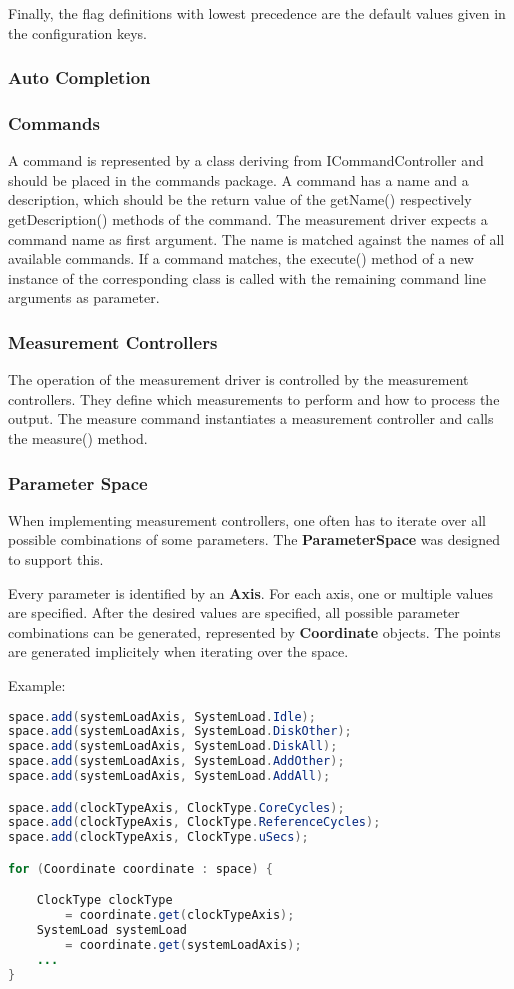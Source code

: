 \documentclass[a4paper,12pt]{article}
\newcommand{\class}[1]{\textbf{#1}}
\begin{document}
Finally, the flag definitions with lowest precedence are the default values
given in the configuration keys.

\subsubsection{Auto Completion}

\subsubsection{Commands}
A command is represented by a class deriving from ICommandController and should
be placed in the commands package. A command has a name and a description, which
should be the return value of the getName() respectively getDescription()
methods of the command. The measurement driver expects a command name as first
argument. The name is matched against the names of all available commands. If a
command matches, the execute() method of a new instance of the corresponding
class is called with the remaining command line arguments as parameter.

\subsubsection{Measurement Controllers}
The operation of the measurement driver is controlled by the measurement
controllers. They define which measurements to perform and how to process the
output. The measure command instantiates a measurement controller and calls the
measure() method.

\subsubsection{Parameter Space}
When implementing measurement controllers, one often has to iterate over all
possible combinations of some parameters. The \class{ParameterSpace} was
designed to support this. 

Every parameter is identified by an \class{Axis}. For
each axis, one or multiple values are specified. After the desired values are
specified, all possible parameter combinations can be generated, represented by
\class{Coordinate} objects. The points are generated implicitely when iterating
over the space.

Example:
\begin{lstlisting}[language=Java]
space.add(systemLoadAxis, SystemLoad.Idle);
space.add(systemLoadAxis, SystemLoad.DiskOther);
space.add(systemLoadAxis, SystemLoad.DiskAll);
space.add(systemLoadAxis, SystemLoad.AddOther);
space.add(systemLoadAxis, SystemLoad.AddAll);

space.add(clockTypeAxis, ClockType.CoreCycles);
space.add(clockTypeAxis, ClockType.ReferenceCycles);
space.add(clockTypeAxis, ClockType.uSecs);

for (Coordinate coordinate : space) {

	ClockType clockType 
		= coordinate.get(clockTypeAxis);
	SystemLoad systemLoad 
		= coordinate.get(systemLoadAxis);
	...
}			
\end{lstlisting}
\end{document}
